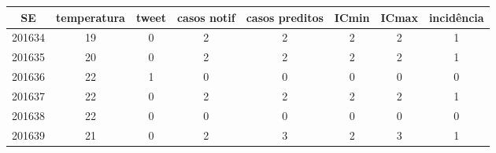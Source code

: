 \begin{tabular}{c|ccccccc}
  \hline
SE & temperatura & tweet & casos notif & casos preditos & ICmin & ICmax & incidência \\ 
  \hline
201634 & 19 & 0 & 2 & 2 & 2 & 2 & 1 \\ 
  201635 & 20 & 0 & 2 & 2 & 2 & 2 & 1 \\ 
  201636 & 22 & 1 & 0 & 0 & 0 & 0 & 0 \\ 
  201637 & 22 & 0 & 2 & 2 & 2 & 2 & 1 \\ 
  201638 & 22 & 0 & 0 & 0 & 0 & 0 & 0 \\ 
  201639 & 21 & 0 & 2 & 3 & 2 & 3 & 1 \\ 
   \hline
\end{tabular}
